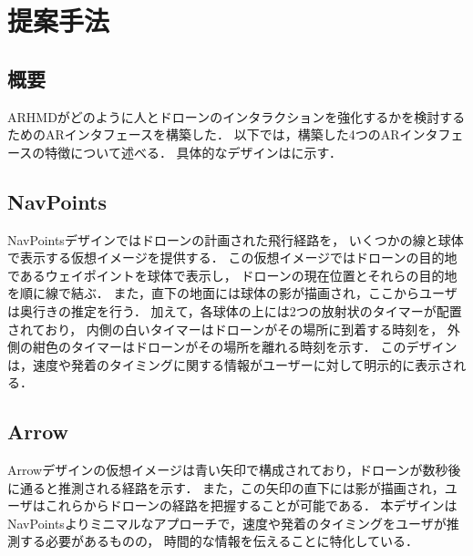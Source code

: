 \documentclass[a4paper,10pt,twocolumn,uplatex]{jsarticle}
\begin{document}


\section{提案手法}\label{discussion}
\subsection{概要}
ARHMDがどのように人とドローンのインタラクションを強化するかを検討するためのARインタフェースを構築した．
以下では，構築した4つのARインタフェースの特徴について述べる．
具体的なデザインはに示す．

\subsection{NavPoints}
NavPointsデザインではドローンの計画された飛行経路を，
いくつかの線と球体で表示する仮想イメージを提供する．
この仮想イメージではドローンの目的地であるウェイポイントを球体で表示し，
ドローンの現在位置とそれらの目的地を順に線で結ぶ．
また，直下の地面には球体の影が描画され，ここからユーザは奥行きの推定を行う．
加えて，各球体の上には2つの放射状のタイマーが配置されており，
内側の白いタイマーはドローンがその場所に到着する時刻を，
外側の紺色のタイマーはドローンがその場所を離れる時刻を示す．
このデザインは，速度や発着のタイミングに関する情報がユーザーに対して明示的に表示される．




\subsection{Arrow}
Arrowデザインの仮想イメージは青い矢印で構成されており，ドローンが数秒後に通ると推測される経路を示す．
また，この矢印の直下には影が描画され，ユーザはこれらからドローンの経路を把握することが可能である．
本デザインはNavPointsよりミニマルなアプローチで，速度や発着のタイミングをユーザが推測する必要があるものの，
時間的な情報を伝えることに特化している．
\end{document}
